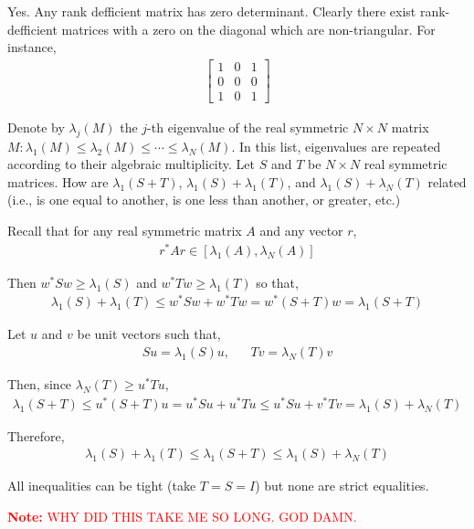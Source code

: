 \documentclass[10pt]{article}
\newcommand{\note}[1]{\textcolor{red}{\textbf{Note:} #1}}
\begin{document}
\begin{solution}[Solution]
Yes. Any rank defficient matrix has zero determinant. Clearly there exist rank-defficient matrices with a zero on the diagonal which are non-triangular. For instance,
    \begin{align*}
        \left[\begin{array}{ccc}1 & 0 & 1 \\ 0 & 0 & 0 \\ 1 & 0 & 1\end{array}\right]
    \end{align*}
    
\end{solution}


\begin{problem}
    Denote by \( \lambda_j(M) \) the \( j \)-th eigenvalue of the real symmetric \( N\times N \) matrix \( M: \lambda_1(M)\leq \lambda_2(M)\leq \cdots \leq \lambda_N(M) \). In this list, eigenvalues are repeated according to their algebraic multiplicity. Let \( S \) and \( T \) be \( N\times N \) real symmetric matrices. How are \( \lambda_1(S + T)\), \( \lambda_1(S) + \lambda_1(T) \), and \( \lambda_1(S) + \lambda_N(T) \) related (i.e., is one equal to another, is one less than another, or greater, etc.)
\end{problem}

\begin{solution}[Solution]

    Recall that for any real symmetric matrix \( A \) and any vector \( r \),
    \begin{align*}
        r^*Ar \in [\lambda_1(A) , \lambda_N(A)]
    \end{align*}
    
    Then \( w^*Sw \geq \lambda_1(S) \) and \( w^*Tw \geq \lambda_1(T) \) so that,
    \begin{align*}
        \lambda_1(S) + \lambda_1(T) \leq w^*Sw + w^*Tw = w^*(S+T)w = \lambda_1(S+T)
    \end{align*}


    Let \( u \) and \( v \) be unit vectors such that,
    \begin{align*}
        Su = \lambda_1(S) u, && Tv = \lambda_N(T) v
    \end{align*}

    Then, since \( \lambda_N(T) \geq u^*Tu  \), 
    \begin{align*}
        \lambda_1(S+T)
        \leq u^*(S+T)u 
        = u^*Su + u^*Tu 
        \leq u^*Su + v^*Tv 
        = \lambda_1(S) + \lambda_N(T) 
    \end{align*}

    Therefore,
    \begin{align*}
        \lambda_1(S) + \lambda_1(T) \leq \lambda_1(S+T) \leq \lambda_1(S) + \lambda_N(T)
    \end{align*}

    All inequalities can be tight (take \( T = S = I \)) but none are strict equalities.
    
    \note{WHY DID THIS TAKE ME SO LONG. GOD DAMN.}

\end{solution}
\end{document}
